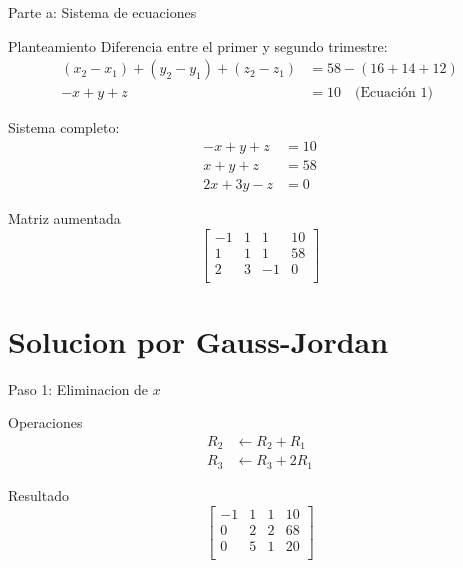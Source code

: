 \documentclass{beamer}
\begin{document}
\begin{frame}{Parte a: Sistema de ecuaciones}
\begin{block}{Planteamiento}
\footnotesize
Diferencia entre el primer y segundo trimestre:
\begin{align*}
(x_2 - x_1) + (y_2 - y_1) + (z_2 - z_1) &= 58 - (16+14+12) \\
-x + y + z &= 10 \quad \text{(Ecuación 1)}
\end{align*}

Sistema completo:
\begin{align*}
-x + y + z &= 10 \\
x + y + z &= 58 \\
2x + 3y - z &= 0
\end{align*}
\end{block}

\begin{alertblock}{Matriz aumentada}
\scriptsize
\[
\left[
\begin{array}{rrr|r}
-1 & 1 & 1 & 10 \\
1 & 1 & 1 & 58 \\
2 & 3 & -1 & 0 \\
\end{array}
\right]
\]
\end{alertblock}
\end{frame}

\section{Solucion por Gauss-Jordan}
\begin{frame}{Paso 1: Eliminacion de $x$}
\begin{block}{Operaciones}
\begin{align*}
R_2 &\leftarrow R_2 + R_1 \\
R_3 &\leftarrow R_3 + 2R_1
\end{align*}
\end{block}

\begin{exampleblock}{Resultado}
\scriptsize
\[
\left[
\begin{array}{rrr|r}
-1 & 1 & 1 & 10 \\
0 & 2 & 2 & 68 \\
0 & 5 & 1 & 20 \\
\end{array}
\right]
\]
\end{exampleblock}
\end{frame}
\end{document}

